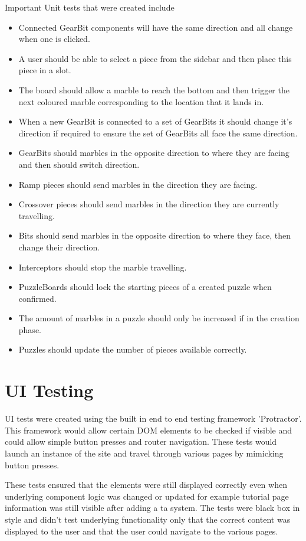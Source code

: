 \documentclass{l4proj}
\begin{document}
Important Unit tests that were created include
\begin{itemize}
    \item Connected GearBit components will have the same direction and all change when one is clicked.
    \item A user should be able to select a piece from the sidebar and then place this piece in a slot.
    \item The board should allow a marble to reach the bottom and then trigger the next coloured marble corresponding to the location that it lands in.
    \item When a new GearBit is connected to a set of GearBits it should change it's direction if required to ensure the set of GearBits all face the same direction.
    \item GearBits should marbles in the opposite direction to where they are facing and then should switch direction.
    \item Ramp pieces should send marbles in the direction they are facing.
    \item Crossover pieces should send marbles in the direction they are currently travelling.
    \item Bits should send marbles in the opposite direction to where they face, then change their direction.
    \item Interceptors should stop the marble travelling.
    \item PuzzleBoards should lock the starting pieces of a created puzzle when confirmed.
    \item The amount of marbles in a puzzle should only be increased if in the creation phase.
    \item Puzzles should update the number of pieces available correctly.
\end{itemize}

\section{UI Testing}
UI tests were created using the built in end to end testing framework 'Protractor'. This framework would allow certain DOM elements to be checked if visible and could allow simple button presses and router navigation. These tests would launch an instance of the site and travel through various pages by mimicking button presses. 

These tests ensured that the elements were still displayed correctly even when underlying component logic was changed or updated for example tutorial page information was still visible after adding a ta system. The tests were black box in style and didn't test underlying functionality only that the correct content was displayed to the user and that the user could navigate to the various pages. 
\end{document}
